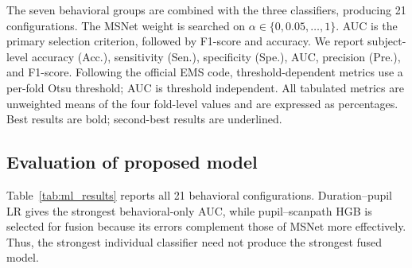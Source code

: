 \documentclass[conference,a4paper]{IEEEtran}
\begin{document}
The seven behavioral groups are combined with the three classifiers, producing 21 configurations. The MSNet weight is searched on $\alpha\in\{0,0.05,\ldots,1\}$. AUC is the primary selection criterion, followed by F1-score and accuracy. We report subject-level accuracy (Acc.), sensitivity (Sen.), specificity (Spe.), AUC, precision (Pre.), and F1-score. Following the official EMS code, threshold-dependent metrics use a per-fold Otsu threshold; AUC is threshold independent. All tabulated metrics are unweighted means of the four fold-level values and are expressed as percentages. Best results are bold; second-best results are underlined.

\subsection{Evaluation of proposed model}
Table~\ref{tab:ml_results} reports all 21 behavioral configurations. Duration--pupil LR gives the strongest behavioral-only AUC, while pupil--scanpath HGB is selected for fusion because its errors complement those of MSNet more effectively. Thus, the strongest individual classifier need not produce the strongest fused model.
\end{document}
